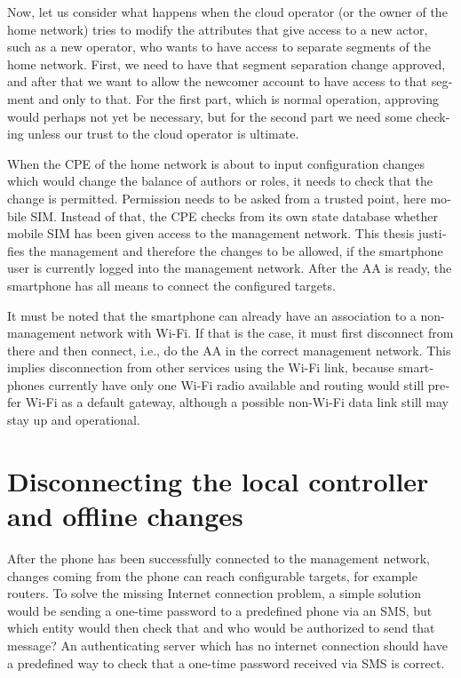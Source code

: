 \documentclass[12pt,a4paper,english]{tutthesis}
\begin{document}
\begin{otherlanguage}{english}
Now, let us consider what happens when the cloud operator (or the owner of
the home network) tries to modify the attributes that give access to a new actor,
such as a new operator, who wants to have access to separate
segments of the home network.  First, we need to have that segment separation
change approved, and after that we want to allow the newcomer account
to have access to that segment and only to that. For the first part,
which is normal operation, approving would perhaps not yet be
necessary, but for the second part we need some checking unless our
trust to the cloud operator is ultimate.  

When the CPE of the home network is about to input configuration changes which
would change the balance of authors or roles, it needs to check that
the change is permitted.  Permission needs to be asked from a trusted
point, here mobile SIM. Instead of that, the CPE checks from its own
state database whether mobile SIM has been given access to the management
network.
This thesis justifies the management and therefore the changes to be
allowed, if the smartphone user is currently logged into the
management network.
After the AA is ready, the smartphone has all means to connect the
configured targets.

It must be noted that the smartphone can already have an association
to a non-management network with Wi-Fi. If that is the case, it
must  first disconnect from there and then connect, i.e., do the  AA in the correct management
network. This implies disconnection from other services using the Wi-Fi
link, because smartphones currently have only one Wi-Fi radio
available and routing would still prefer Wi-Fi as a default gateway, although
a possible non-Wi-Fi data link still may stay up and operational.
\section{Disconnecting the local controller and offline changes}
\label{sec-4-6}
\label{sec:disconnections}













After the phone has been successfully connected to the management
network, changes coming from the phone can reach configurable targets,
for example routers.  
To solve the missing Internet connection problem, a simple solution would be
sending a one-time password to a predefined phone via an SMS, but which
entity would then check that and who would be authorized to send that message?
An authenticating server which has no internet connection should 
have a predefined way to check that a one-time password received via SMS is correct.


\end{otherlanguage}
\end{document}
